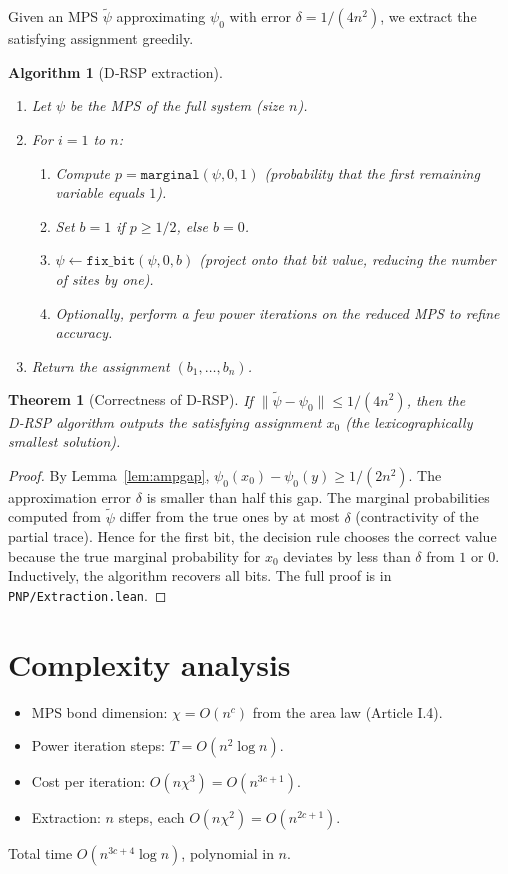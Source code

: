 \documentclass[11pt,a4paper]{article}
\newtheorem{theorem}{Theorem}[section]
\newtheorem{algorithm}{Algorithm}[section]
\begin{document}
Given an MPS $\tilde{\psi}$ approximating $\psi_0$ with error $\delta = 1/(4n^2)$, we extract the satisfying assignment greedily.

\begin{algorithm}[D‑RSP extraction]\label{alg:drsp}
\begin{enumerate}
\item Let $\psi$ be the MPS of the full system (size $n$).
\item For $i = 1$ to $n$:
   \begin{enumerate}
   \item Compute $p = \texttt{marginal}(\psi, 0, 1)$ (probability that the first remaining variable equals $1$).
   \item Set $b = 1$ if $p \ge 1/2$, else $b = 0$.
   \item $\psi \leftarrow \texttt{fix\_bit}(\psi, 0, b)$ (project onto that bit value, reducing the number of sites by one).
   \item Optionally, perform a few power iterations on the reduced MPS to refine accuracy.
   \end{enumerate}
\item Return the assignment $(b_1,\dots,b_n)$.
\end{enumerate}
\end{algorithm}

\begin{theorem}[Correctness of D‑RSP]\label{thm:drsp}
If $\|\tilde{\psi} - \psi_0\| \le 1/(4n^2)$, then the D‑RSP algorithm outputs the satisfying assignment $x_0$ (the lexicographically smallest solution).
\end{theorem}
\begin{proof}
By Lemma~\ref{lem:ampgap}, $\psi_0(x_0) - \psi_0(y) \ge 1/(2n^2)$. The approximation error $\delta$ is smaller than half this gap. The marginal probabilities computed from $\tilde{\psi}$ differ from the true ones by at most $\delta$ (contractivity of the partial trace). Hence for the first bit, the decision rule chooses the correct value because the true marginal probability for $x_0$ deviates by less than $\delta$ from $1$ or $0$. Inductively, the algorithm recovers all bits. The full proof is in \texttt{PNP/Extraction.lean}.
\end{proof}

\section{Complexity analysis}

\begin{itemize}
\item MPS bond dimension: $\chi = O(n^c)$ from the area law (Article I.4).
\item Power iteration steps: $T = O(n^2 \log n)$.
\item Cost per iteration: $O(n\chi^3) = O(n^{3c+1})$.
\item Extraction: $n$ steps, each $O(n\chi^2) = O(n^{2c+1})$.
\end{itemize}
Total time $O(n^{3c+4}\log n)$, polynomial in $n$.
\end{document}
